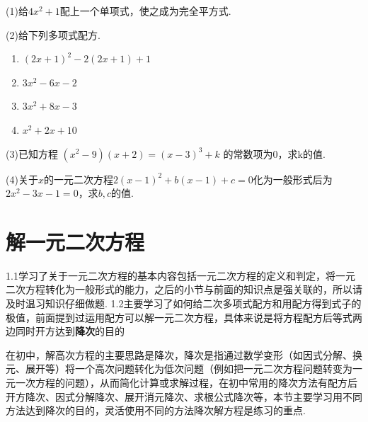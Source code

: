 \documentclass[lang=cn, 10pt, titlestyle=hang, oneside]{elegantbook}
\begin{document}
\begin{exercise}
\small
    \setlength{\parindent}{0pt} %
    \setlength{\columnseprule}{0.01pt}
    \begin{multicols}{2}
        \begin{minipage}{1\linewidth}
        (1)给\( 4x^2 +1\)配上一个单项式，使之成为完全平方式.
        \end{minipage}
        
        \begin{minipage}{1\linewidth}
        (2)给下列多项式配方.
        \begin{enumerate}
            \item \((2x+1)^2-2(2x+1)+1\)
            \item \(3x^2-6x-2\)
            \item \(3x^2+8x-3\)
            \item \(x^2+2x+10\)
        \end{enumerate}
        \end{minipage}
        \begin{minipage}{1\linewidth}
        (3)已知方程 $(x^2-9)(x+2) = (x-3)^3 + k$ 的常数项为0，求k的值.
        \end{minipage}

        \begin{minipage}{1\linewidth}
        (4)关于$x$的一元二次方程\(2(x-1)^2+b(x-1)+c=0\)化为一般形式后为\(2x^2-3x-1=0\)，求\(b,c\)的值.
        \end{minipage}
        
    \end{multicols}
\end{exercise}







\section{解一元二次方程}
1.1学习了关于一元二次方程的基本内容包括一元二次方程的定义和判定，将一元二次方程转化为一般形式的能力，之后的小节与前面的知识点是强关联的，所以请及时温习知识仔细做题. 1.2主要学习了如何给二次多项式配方和用配方得到式子的极值，前面提到过运用配方可以解一元二次方程，具体来说是将方程配方后等式两边同时开方达到\textbf{降次}的目的
\par
在初中，解高次方程的主要思路是降次，降次是指通过数学变形（如因式分解、换元、展开等）将一个高次问题转化为低次问题（例如把一元二次方程问题转变为一元一次方程的问题），从而简化计算或求解过程，在初中常用的降次方法有配方后开方降次、因式分解降次、展开消元降次、求根公式降次等，本节主要学习用不同方法达到降次的目的，灵活使用不同的方法降次解方程是练习的重点.
\end{document}
